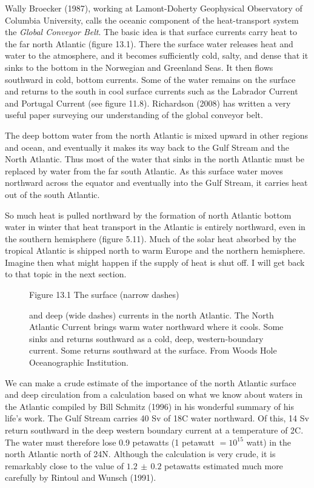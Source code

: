 Wally Broecker (1987), working at Lamont-Doherty Geophysical
Observatory of Columbia University, calls the oceanic component of the
heat-transport system the \textit{Global
  Conveyor Belt}. The basic idea is that surface
currents carry heat to the far north Atlantic (figure 13.1). There the
surface water releases heat and water to the atmosphere, and it
becomes sufficiently cold, salty, and dense that it sinks to the
bottom in the Norwegian and
Greenland Seas. It then flows southward in cold, bottom currents. Some
of the water remains on the surface and returns to the south in cool
surface currents such as the Labrador Current and Portugal Current
(see figure 11.8). Richardson (2008) has written a very useful paper
surveying our understanding of the global conveyor belt.

The deep bottom water from the north Atlantic is mixed upward in other regions and ocean, and eventually
it makes its way back to the Gulf Stream and the North Atlantic. Thus
most of the water that sinks in the north Atlantic must be replaced by
water from the far south Atlantic. As this surface water moves
northward across the equator and eventually into the Gulf Stream, it
carries heat out of the south Atlantic.

So much heat is pulled northward by the
formation of north Atlantic bottom water in winter that heat transport
in the Atlantic is entirely northward, even in the southern hemisphere
(figure 5.11). Much of the solar heat absorbed by the tropical
Atlantic is shipped north to warm Europe and the northern
hemisphere. Imagine then what might happen if the supply of heat is
shut off. I will get back to that topic in the next section.

\begin{figure}[t!]
\footnotesize
Figure 13.1 The surface (narrow dashes) \rule{0mm}{3ex}and deep (wide
dashes) currents in the north Atlantic. The North Atlantic Current
brings warm water northward where it cools.  Some sinks and returns
southward as a cold, deep, western-boundary current. Some returns
southward at the surface. From Woods Hole Oceanographic Institution.
\label{fig:fig13-1}
\vspace{-4ex}
\end{figure}

We can make a crude estimate of the importance of the north Atlantic
surface and deep circulation from a calculation based on what we know
about waters in the Atlantic compiled by Bill Schmitz (1996) in his
wonderful summary of his life's work. The Gulf Stream carries 40 Sv of
18\degrees C water northward. Of this, 14 Sv return southward in the
deep western boundary current at a temperature of 2\degrees C. The
water must therefore lose 0.9 petawatts (1 petawatt $= 10^{15} $ watt)
in the north Atlantic north of 24\degrees N. Although the calculation
is very crude, it is remarkably close to the value of $1.2\,\pm\,0.2$
petawatts estimated much more carefully by Rintoul and Wunsch (1991).

